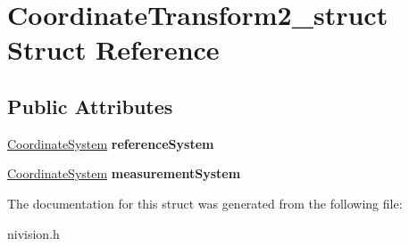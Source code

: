 \hypertarget{structCoordinateTransform2__struct}{
\section{CoordinateTransform2\_\-struct Struct Reference}
\label{structCoordinateTransform2__struct}
}
\subsection*{Public Attributes}
\begin{DoxyCompactItemize}
\item 
\hypertarget{structCoordinateTransform2__struct_a4c0971022b5b8c188d658a165eee042d}{
\hyperlink{structCoordinateSystem__struct}{CoordinateSystem} {\bfseries referenceSystem}}
\label{structCoordinateTransform2__struct_a4c0971022b5b8c188d658a165eee042d}

\item 
\hypertarget{structCoordinateTransform2__struct_abc8201cd65f41a049da32e0a0f7c4072}{
\hyperlink{structCoordinateSystem__struct}{CoordinateSystem} {\bfseries measurementSystem}}
\label{structCoordinateTransform2__struct_abc8201cd65f41a049da32e0a0f7c4072}

\end{DoxyCompactItemize}


The documentation for this struct was generated from the following file:\begin{DoxyCompactItemize}
\item 
nivision.h\end{DoxyCompactItemize}
